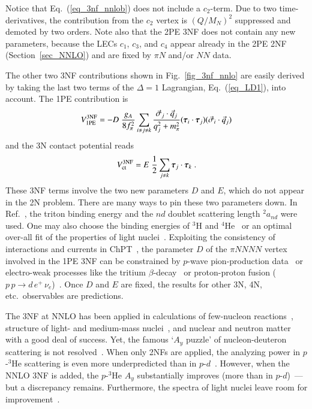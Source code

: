 \documentclass[sort&compress,preprint,3p]{elsarticle}
\begin{document}
Notice that Eq.~(\ref{eq_3nf_nnlob}) does not include a $c_2$-term.
Due to two time-derivatives, the contribution from the $c_2$ vertex is $(Q/M_N)^2$ suppressed and
demoted by two orders. Note also that
the 2PE 3NF does not contain any new parameters,
because the LECs $c_1$, $c_3$, and $c_4$ appear already  in the 2PE 2NF (Section~\ref{sec_NNLO}) and
are fixed by $\pi N$ and/or $NN$ data.

The other two 3NF contributions shown in Fig.~\ref{fig_3nf_nnlo}
are easily derived by taking the last two terms of the $\Delta=1$ Lagrangian, Eq.~(\ref{eq_LD1}),
into account. The 1PE contribution is
\begin{equation}
V^{\rm 3NF}_{\rm 1PE} = 
-D \; \frac{g_A}{8f^2_\pi} 
\sum_{i \neq j \neq k}
\frac{\vec \sigma_j \cdot \vec q_j}{
 q^2_j + m^2_\pi }
( \mbox{\boldmath $\tau$}_i \cdot \mbox{\boldmath $\tau$}_j ) 
( \vec \sigma_i \cdot \vec q_j ) 
\label{eq_3nf_nnloc}
\end{equation}
and the 3N contact potential reads
\begin{equation}
V^{\rm 3NF}_{\rm ct} = E \; \frac12
\sum_{j \neq k} 
 \mbox{\boldmath $\tau$}_j \cdot \mbox{\boldmath $\tau$}_k  \; .
\label{eq_3nf_nnlod}
\end{equation}
These 3NF terms involve the two new parameters $D$ and $E$, 
which do not appear in the 2N problem.
There are many ways to pin these two parameters down.
In Ref.~\cite{Epe02b},
the triton binding energy and the $nd$ doublet scattering
length $^2a_{nd}$ were used.
One may also choose the binding
energies of $^3$H and $^4$He~\cite{Nog06} or
an optimal over-all fit of the properties of light nuclei~\cite{Nav07}.
Exploiting the consistency of interactions and currents in ChPT~\cite{GP06},
the parameter $D$ of the $\pi NNNN$ vertex involved in the
1PE 3NF can be constrained by $p$-wave pion-production data~\cite{HKM00}
or electro-weak processes like the tritium $\beta$-decay~\cite{GQN09}
or proton-proton fusion ($p\,p \rightarrow d \, e^+ \, \nu_e$)~\cite{Nak08}.
Once $D$ and $E$ are fixed, the results for other
3N, 4N, etc.\  observables are predictions.

The 3NF at NNLO has been applied in
calculations of few-nucleon 
reactions~\cite{Epe02b,Erm05,Kis05,Wit06,Ley06,Ste07,KE07,Mar09,Kie10,Viv10},
structure of light- and medium-mass 
nuclei~\cite{Nog06,Nav07,Hag07,Ots09},
and nuclear and neutron matter~\cite{Bog05,HS09}
with a good deal of success.
Yet, the famous `$A_y$ puzzle' of nucleon-deuteron scattering
is not resolved~\cite{Epe02b,KE07}.
When only 2NFs are applied,
the analyzing power in $p$-$^3$He scattering
is even more underpredicted than in $p$-$d$~\cite{Fis06,DF07}. 
However, when the
NNLO 3NF is added, the $p$-$^3$He $A_y$ substantially 
improves (more than in $p$-$d$)~\cite{Viv10}---but a discrepancy remains.
Furthermore, the spectra of light nuclei leave room for improvement~\cite{Nav07}.
\end{document}
